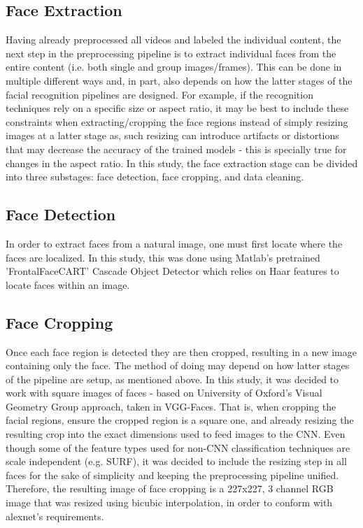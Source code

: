 \documentclass[11pt]{article}
\begin{document}
    \subsection{Face Extraction}
        Having already preprocessed all videos and labeled the individual content, the next step in the preprocessing pipeline is to extract individual faces from the entire content (i.e. both single and group images/frames). This can be done in multiple different ways and, in part, also depends on how the latter stages of the facial recognition pipelines are designed. For example, if the recognition techniques rely on a specific size or aspect ratio, it may be best to include these constraints when extracting/cropping the face regions instead of simply resizing images at a latter stage as, such resizing can introduce artifacts or distortions that may decrease the accuracy of the trained models - this is specially true for changes in the aspect ratio. In this study, the face extraction stage can be divided into three substages: face detection, face cropping, and data cleaning.

        \subsection{Face Detection}
            In order to extract faces from a natural image, one must first locate where the faces are localized. In this study, this was done using Matlab's pretrained 'FrontalFaceCART' Cascade Object Detector which relies on Haar features to locate faces within an image.

        \subsection{Face Cropping}
            Once each face region is detected they are then cropped, resulting in a new image containing only the face. The method of doing may depend on how latter stages of the pipeline are setup, as mentioned above. In this study, it was decided to work with square images of faces - based on University of Oxford's Visual Geometry Group approach, taken in VGG-Faces. That is, when cropping the facial regions, ensure the cropped region is a square one, and already resizing the resulting crop into the exact dimensions used to feed images to the CNN. Even though some of the feature types used for non-CNN classification techniques are scale independent (e.g. SURF), it was decided to include the resizing step in all faces for the sake of simplicity and keeping the preprocessing pipeline unified. Therefore, the resulting image of face cropping is a 227x227, 3 channel RGB image that was resized using bicubic interpolation, in order to conform with alexnet's requirements.
\end{document}
